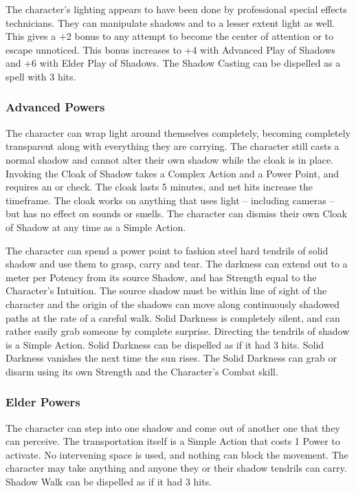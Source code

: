  The character's lighting appears to have been done by professional special effects technicians. They can manipulate shadows and to a lesser extent light as well. This gives a +2 bonus to any attempt to become the center of attention or to escape unnoticed. This bonus increases to +4 with Advanced Play of Shadows and +6 with Elder Play of Shadows. The Shadow Casting can be dispelled as a spell with 3 hits.

\subsubsection{Advanced Powers}

 The character can wrap light around themselves completely, becoming completely transparent along with everything they are carrying. The character still casts a normal shadow and cannot alter their own shadow while the cloak is in place. Invoking the Cloak of Shadow takes a Complex Action and a Power Point, and requires an  or  check. The cloak lasts 5 minutes, and net hits increase the timeframe. The cloak works on anything that uses light -- including cameras -- but has no effect on sounds or smells. The character can dismiss their own Cloak of Shadow at any time as a Simple Action.

 The character can spend a power point to fashion steel hard tendrils of solid shadow and use them to grasp, carry and tear. The darkness can extend out to a meter per Potency from its source Shadow, and has Strength equal to the Character's Intuition. The source shadow must be within line of sight of the character and the origin of the shadows can move along continuously shadowed paths at the rate of a careful walk. Solid Darkness is completely silent, and can rather easily grab someone by complete surprise. Directing the tendrils of shadow is a Simple Action. Solid Darkness can be dispelled as if it had 3 hits. Solid Darkness vanishes the next time the sun rises. The Solid Darkness can grab or disarm using its own Strength and the Character's Combat skill.

\subsubsection{Elder Powers}

 The character can step into one shadow and come out of another one that they can perceive. The transportation itself is a Simple Action that costs 1 Power to activate. No intervening space is used, and nothing can block the movement. The character may take anything and anyone they or their shadow tendrils can carry. Shadow Walk can be dispelled as if it had 3 hits.

